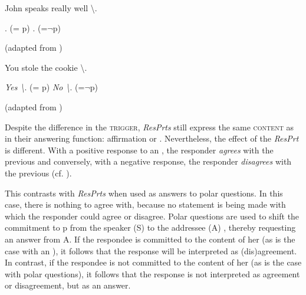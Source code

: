\documentclass[output=paper]{LSP/langsci}
\begin{document}
\settowidth{}
\ea\label{ex:wiltschko:16}
\begin{xlist}
  John speaks  really well {\textbackslash}.   
  \begin{xlisti}
          \ex{}. (= p)  
          \ex{}. (=$¬$p)\footnotemark {}
          \end{xlisti}
\end{xlist}          
(adapted from \citealt[211 (4)]{holmberg:15})
\z 
{} 

\ea\label{ex:wiltschko:17}
\begin{xlist}
 You stole the cookie {\textbackslash}.     
  \begin{xlisti}
  \ex \textit{Yes {\textbackslash}}. (= p)        
  \ex \textit{No {\textbackslash}}.  (=$¬$p)      
  \end{xlisti}
 \end{xlist}
(adapted from \citealt[2 (2a)]{Krifka2013})
\z

Despite the difference in the \textsc{trigger}\textsc{}, \textit{ResPrts} still express the same \textsc{content} as in their answering function\textsc{:} affirmation or \textsc{.} Nevertheless, the effect of the \textit{ResPrt} is different. With a positive response to an , the responder \textit{agrees} with the previous  and conversely, with a negative response, the responder \textit{disagrees} with the previous  (cf.
\citealt{FarkasBruce2009}). 

This contrasts with \textit{ResPrts} when used as answers to polar questions. In this case, there is nothing to agree with, because no statement is being made with which the responder could agree or disagree.
Polar questions are used to shift the commitment to p from the speaker (S) to the addressee (A) \citep{Gunlogson2003}, thereby requesting an answer from A. If the respondee is committed to the content of her  (as is the case with an ), it follows that the response will be interpreted as (dis)agreement. In contrast, if the respondee is not committed to the content of her  (as is the case with polar questions), it follows that the response is not interpreted as agreement or disagreement, but as an answer. 
\end{document}
